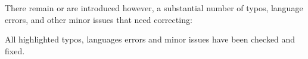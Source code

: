 \documentclass[10pt]{article}
\begin{document}
\begin{response}{There remain or are introduced however, a substantial number of typos, language errors, and other minor issues that need correcting:} 

All highlighted typos, languages errors and minor issues have been checked and fixed.



\end{response}
\end{document}
